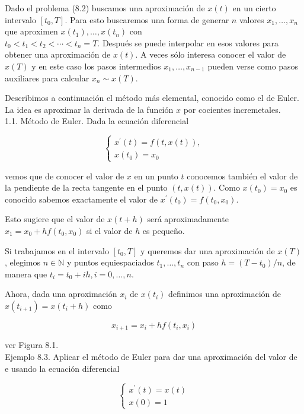 \documentclass[10pt]{article}
\begin{document}
Dado el problema (8.2) buscamos una aproximación de $x(t)$ en un cierto intervalo $\left[t_{0}, T\right]$. Para esto buscaremos una forma de generar $n$ valores $x_{1}, \ldots, x_{n}$ que aproximen $x\left(t_{1}\right), \ldots, x\left(t_{n}\right)$ con\\
$t_{0}<t_{1}<t_{2}<\cdots<t_{n}=T$. Después se puede interpolar en esos valores para obtener una aproximación de $x(t)$. A veces sólo interesa conocer el valor de $x(T)$ y en este caso los pasos intermedios $x_{1}, \ldots, x_{n-1}$ pueden verse como pasos auxiliares para calcular $x_{n} \sim x(T)$.

Describimos a continuación el método más elemental, conocido como el de Euler. La idea es aproximar la derivada de la función $x$ por cocientes incremetales.\\
1.1. Método de Euler. Dada la ecuación diferencial

$$
\left\{\begin{array}{l}
x^{\prime}(t)=f(t, x(t)), \\
x\left(t_{0}\right)=x_{0}
\end{array}\right.
$$

vemos que de conocer el valor de $x$ en un punto $t$ conocemos también el valor de la pendiente de la recta tangente en el punto $(t, x(t))$. Como $x\left(t_{0}\right)=x_{0}$ es conocido sabemos exactamente el valor de $x^{\prime}\left(t_{0}\right)=f\left(t_{0}, x_{0}\right)$.

Esto sugiere que el valor de $x(t+h)$ será aproximadamente $x_{1}=x_{0}+h f\left(t_{0}, x_{0}\right)$ si el valor de $h$ es pequeño.

Si trabajamos en el intervalo $\left[t_{0}, T\right]$ y queremos dar una aproximación de $x(T)$, elegimos $n \in \mathbb{N}$ y puntos equiespaciados $t_{1}, \ldots, t_{n}$ con paso $h=\left(T-t_{0}\right) / n$, de manera que $t_{i}=t_{0}+i h, i=0, \ldots, n$.

Ahora, dada una aproximación $x_{i}$ de $x\left(t_{i}\right)$ definimos una aproximación de $x\left(t_{i+1}\right)=x\left(t_{i}+h\right)$ como


\begin{equation*}
x_{i+1}=x_{i}+h f\left(t_{i}, x_{i}\right) \tag{8.3}
\end{equation*}


ver Figura 8.1.\\
Ejemplo 8.3. Aplicar el método de Euler para dar una aproximación del valor de e usando la ecuación diferencial

$$
\left\{\begin{array}{l}
x^{\prime}(t)=x(t) \\
x(0)=1
\end{array}\right.
$$
\end{document}
